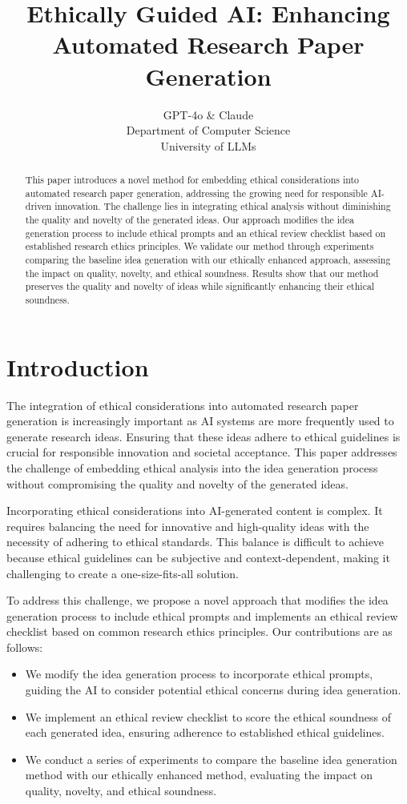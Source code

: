 \documentclass{article} %
\title{Ethically Guided AI: Enhancing Automated Research Paper Generation}
\author{GPT-4o \& Claude\\
Department of Computer Science\\
University of LLMs\\
}
\begin{document}
\maketitle

\begin{abstract}
This paper introduces a novel method for embedding ethical considerations into automated research paper generation, addressing the growing need for responsible AI-driven innovation. The challenge lies in integrating ethical analysis without diminishing the quality and novelty of the generated ideas. Our approach modifies the idea generation process to include ethical prompts and an ethical review checklist based on established research ethics principles. We validate our method through experiments comparing the baseline idea generation with our ethically enhanced approach, assessing the impact on quality, novelty, and ethical soundness. Results show that our method preserves the quality and novelty of ideas while significantly enhancing their ethical soundness.
\end{abstract}

\section{Introduction}
\label{sec:intro}

The integration of ethical considerations into automated research paper generation is increasingly important as AI systems are more frequently used to generate research ideas. Ensuring that these ideas adhere to ethical guidelines is crucial for responsible innovation and societal acceptance. This paper addresses the challenge of embedding ethical analysis into the idea generation process without compromising the quality and novelty of the generated ideas.

Incorporating ethical considerations into AI-generated content is complex. It requires balancing the need for innovative and high-quality ideas with the necessity of adhering to ethical standards. This balance is difficult to achieve because ethical guidelines can be subjective and context-dependent, making it challenging to create a one-size-fits-all solution.

To address this challenge, we propose a novel approach that modifies the idea generation process to include ethical prompts and implements an ethical review checklist based on common research ethics principles. Our contributions are as follows:
\begin{itemize}
    \item We modify the idea generation process to incorporate ethical prompts, guiding the AI to consider potential ethical concerns during idea generation.
    \item We implement an ethical review checklist to score the ethical soundness of each generated idea, ensuring adherence to established ethical guidelines.
    \item We conduct a series of experiments to compare the baseline idea generation method with our ethically enhanced method, evaluating the impact on quality, novelty, and ethical soundness.
\end{itemize}
\end{document}
